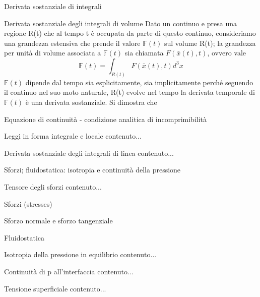 \documentclass[a4paper,11pt]{report}
\newcommand{\xt}{\bar{x}(t)}
\begin{document}
	\begin{chapter}{Derivata sostanziale di integrali}
		\begin{section}{Derivata sostanziale degli integrali di volume}
			Dato un continuo e presa una regione R(t) che al tempo t è occupata da parte di questo continuo, consideriamo una grandezza estensiva che prende il valore $\mathbb{F}(t)$ sul volume R(t); la grandezza per unità di volume associata a $\mathbb{F}(t)$ sia chiamata $F(\xt,t)$, ovvero vale
			\begin{equation}
				\mathbb{F}(t) = \int_{R(t)} F(\xt,t)d^3x
			\end{equation}
			$\mathbb{F}(t)$ dipende dal tempo sia esplicitamente, sia implicitamente perché seguendo il continuo nel suo moto naturale, R(t) evolve nel tempo la derivata temporale di $\mathbb{F}(t)$ è una derivata sostanziale. Si dimostra che 
		\end{section}
	
		\begin{section}{Equazione di continuità - condizione analitica di incomprimibilità}
		\end{section}
	
		\begin{section}{Leggi in forma integrale e locale}
		contenuto...
		\end{section}
		\begin{section}{Derivata sostanziale degli integrali di linea}
			contenuto...
		\end{section}
	\end{chapter}
	
	\begin{chapter}{Sforzi; fluidostatica: isotropia e continuità della pressione}
		\begin{section}{Tensore degli sforzi}
			contenuto...
		\end{section}
		\begin{section}{Sforzi (stresses)}
			\begin{subsection}{Sforzo normale e sforzo tangenziale}
				
			\end{subsection}
		\end{section}
		\begin{section}{Fluidostatica}
			\begin{subsection}{Isotropia della pressione in equilibrio}
				contenuto...
			\end{subsection}
			\begin{subsection}{Continuità di p all'interfaccia}
				contenuto...
			\end{subsection}
			\begin{subsection}{Tensione superficiale}
				contenuto...
			\end{subsection}
		\end{section}
	\end{chapter}
\end{document}
